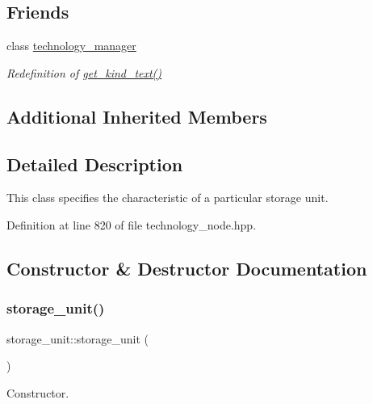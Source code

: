 \subsection*{Friends}
\begin{DoxyCompactItemize}
\item 
class \hyperlink{structstorage__unit_a7012231228df7578c7338a9773121f88}{technology\+\_\+manager}
\begin{DoxyCompactList}\small\item\em Redefinition of \hyperlink{structtechnology__node_a4b8785a8d6c2db19e1bec0d3eef5c8f2}{get\+\_\+kind\+\_\+text()} \end{DoxyCompactList}\end{DoxyCompactItemize}
\subsection*{Additional Inherited Members}


\subsection{Detailed Description}
This class specifies the characteristic of a particular storage unit. 

Definition at line 820 of file technology\+\_\+node.\+hpp.



\subsection{Constructor \& Destructor Documentation}
\mbox{\label{structstorage__unit_aa0a788929d57fbe8e746523587c7b362}} 
\subsubsection{\texorpdfstring{storage\+\_\+unit()}{storage\_unit()}}
{\footnotesize\ttfamily storage\+\_\+unit\+::storage\+\_\+unit (\begin{DoxyParamCaption}{ }\end{DoxyParamCaption})\hspace{0.3cm}{\ttfamily [inline]}}



Constructor. 



